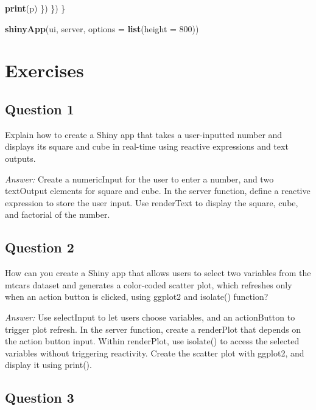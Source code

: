 \documentclass[
]{book}
\newenvironment{Shaded}{\begin{snugshade}}{\end{snugshade}}
\newcommand{\AttributeTok}[1]{\textcolor[rgb]{0.13,0.29,0.53}{#1}}
\newcommand{\DecValTok}[1]{\textcolor[rgb]{0.00,0.00,0.81}{#1}}
\newcommand{\FunctionTok}[1]{\textcolor[rgb]{0.13,0.29,0.53}{\textbf{#1}}}
\newcommand{\NormalTok}[1]{#1}
\begin{document}
\begin{Shaded}
\begin{Highlighting}[]
      \FunctionTok{print}\NormalTok{(p)}
\NormalTok{    \})}
\NormalTok{  \})}
\NormalTok{\}}

\FunctionTok{shinyApp}\NormalTok{(ui, server, }\AttributeTok{options =} \FunctionTok{list}\NormalTok{(}\AttributeTok{height =} \DecValTok{800}\NormalTok{))}
\end{Highlighting}
\end{Shaded}

\hypertarget{exercises}{%
\section{Exercises}\label{exercises}}

\hypertarget{question-1}{%
\subsection{Question 1}\label{question-1}}

Explain how to create a Shiny app that takes a user-inputted number and displays its square and cube in real-time using reactive expressions and text outputs.

\emph{Answer:} Create a numericInput for the user to enter a number, and two textOutput elements for square and cube. In the server function, define a reactive expression to store the user input. Use renderText to display the square, cube, and factorial of the number.

\hypertarget{question-2}{%
\subsection{Question 2}\label{question-2}}

How can you create a Shiny app that allows users to select two variables from the mtcars dataset and generates a color-coded scatter plot, which refreshes only when an action button is clicked, using ggplot2 and isolate() function?

\emph{Answer:} Use selectInput to let users choose variables, and an actionButton to trigger plot refresh. In the server function, create a renderPlot that depends on the action button input. Within renderPlot, use isolate() to access the selected variables without triggering reactivity. Create the scatter plot with ggplot2, and display it using print().

\hypertarget{question-3}{%
\subsection{Question 3}\label{question-3}}
\end{document}
